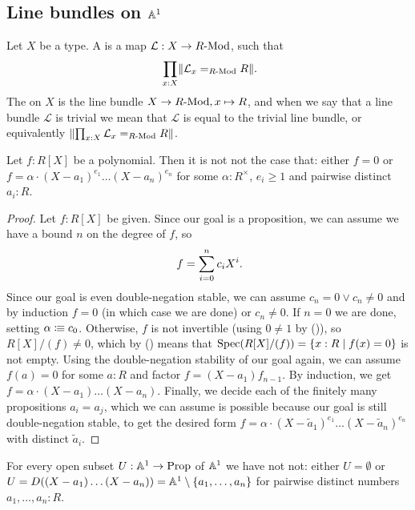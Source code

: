 \subsection{Line bundles on $\mathbb{A}^1$}

\begin{definition}%
  Let $X$ be a type.
  A  is a map $\mathcal L : X\to R\text{-}\mathrm{Mod}$,
  such that
  \[ \prod_{x:X} \propTrunc{\mathcal L_x=_{\Mod{R}}R} \rlap{.}\]
  The  on $X$ is the line bundle
  $X \to R\text{-}\mathrm{Mod}, x \mapsto R$,
  and when we say that a line bundle $\mathcal{L}$ is trivial
  we mean that $\mathcal{L}$ is equal to the trivial line bundle,
  or equivalently $\lVert \prod_{x:X} \mathcal L_x=_{R\text{-}\mathrm{Mod}}R \rVert$.
\end{definition}

\begin{lemma}%
  \label{polynomials-notnot-decompose}
  Let $f : R[X]$ be a polynomial.
  Then it is not not the case that:
  either $f = 0$ or
  $f = \alpha \cdot {(X - a_1)}^{e_1} \dots {(X - a_n)}^{e_n}$
  for some $\alpha : R^\times$,
  $e_i \geq 1$ and pairwise distinct $a_i : R$.
\end{lemma}

\begin{proof}
  Let $f : R[X]$ be given.
  Since our goal is a proposition,
  we can assume we have a bound $n$ on the degree of $f$,
  so
  \[ f = \sum_{i = 0}^n c_i X^i \rlap{.} \]
  Since our goal is even double-negation stable,
  we can assume $c_n = 0 \lor c_n \neq 0$
  and by induction $f = 0$ (in which case we are done)
  or $c_n \neq 0$.
  If $n = 0$ we are done,
  setting $\alpha \vcentcolon\mspace{-1.2mu}\equiv c_0$.
  Otherwise,
  $f$ is not invertible (using $0 \neq 1$ by ()),
  so $R[X]/(f) \neq 0$,
  which by () means that
  $\operatorname{Spec}(R[X]/(f)) = \{ x : R \mid f(x) = 0 \}$
  is not empty.
  Using the double-negation stability of our goal again,
  we can assume $f(a) = 0$ for some $a : R$
  and factor $f = (X - a_1) f_{n - 1}$.
  By induction, we get $f = \alpha \cdot (X - a_1) \dots (X - a_n)$.
  Finally, we decide each of the finitely many propositions $a_i = a_j$,
  which we can assume is possible
  because our goal is still double-negation stable,
  to get the desired form
  $f = \alpha \cdot {(X - \widetilde{a}_1)}^{e_1} \dots {(X - \widetilde{a}_n)}^{e_n}$
  with distinct $\widetilde{a}_i$.
\end{proof}

\begin{lemma}
  For every open subset $U : \mathbb{A}^1 \to \mathrm{Prop}$ of $\mathbb{A}^1$
  we have not not:
  either $U = \emptyset$
  or $U = D((X - a_1)\dots(X - a_n)) = \mathbb{A}^1 \setminus \{ a_1, \dots, a_n \}$
  for pairwise distinct numbers $a_1, \dots, a_n : R$.
\end{lemma}

